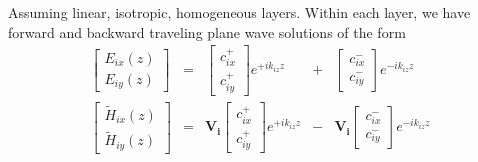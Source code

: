 \documentclass[notitlepage,nofootinbib]{revtex4-1}
\renewcommand{\vec}[1]{\mathbf{#1}}
\begin{document}
Assuming linear, isotropic, homogeneous layers. Within each layer, we have forward and backward traveling plane wave solutions of the form
\begin{subequations}\begin{alignat}{5}
	\begin{bmatrix}
		E_{ix}(z) \\
		E_{iy}(z)
	\end{bmatrix}
	&=&
	\begin{bmatrix}
		c_{ix}^+ \\
		c_{iy}^+
	\end{bmatrix}e^{+i k_{iz} z}
	&+&
	\begin{bmatrix}
		c_{ix}^- \\
		c_{iy}^-
	\end{bmatrix}e^{-i k_{iz} z}
	\\
	\begin{bmatrix}
		\tilde{H}_{ix}(z) \\
		\tilde{H}_{iy}(z)
	\end{bmatrix}
	&=&
	\vec{V_i}\begin{bmatrix}
		c_{ix}^+ \\
		c_{iy}^+
	\end{bmatrix}e^{+i k_{iz} z}
	&-&
	\vec{V_i}\begin{bmatrix}
		c_{ix}^- \\
		c_{iy}^-
	\end{bmatrix}e^{-i k_{iz} z}
\end{alignat}\end{subequations}
\end{document}
